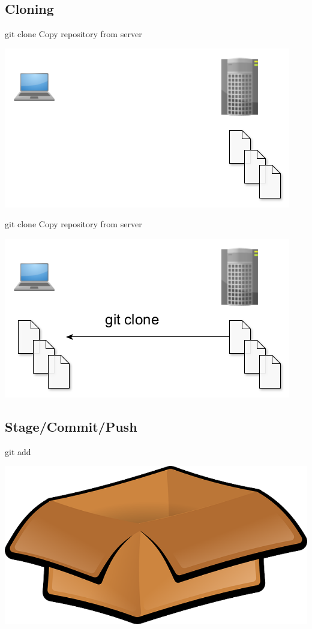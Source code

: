 \documentclass{beamer}
\begin{document}
\subsection{Cloning}
\begin{frame}{git clone}
     Copy repository from server \pause
    \begin{center}
        \includegraphics[width=0.5\linewidth]{img/git_clone_1.png}
    \end{center}
\end{frame}

\begin{frame}{git clone}
    Copy repository from server 
    \begin{center}
        \includegraphics[width=0.5\linewidth]{img/git_clone_2.png}
    \end{center}
\end{frame}

\subsection{Stage/Commit/Push}

\begin{frame}{git add}
    \begin{center}
        \includegraphics[width=0.5\linewidth]{img/add.png}
    \end{center}
\end{frame}
\end{document}
